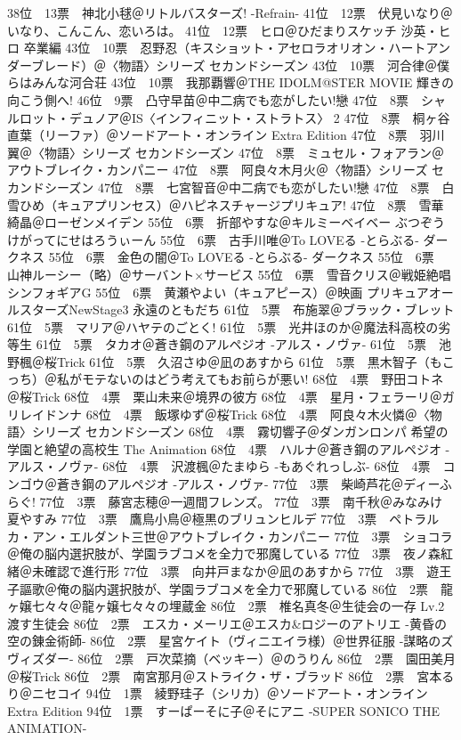 	38位　13票　神北小毬＠リトルバスターズ! -Refrain-
	41位　12票　伏見いなり＠いなり、こんこん、恋いろは。
	41位　12票　ヒロ＠ひだまりスケッチ 沙英・ヒロ 卒業編
	43位　10票　忍野忍（キスショット・アセロラオリオン・ハートアンダーブレード）＠〈物語〉シリーズ セカンドシーズン
	43位　10票　河合律＠僕らはみんな河合荘
	43位　10票　我那覇響＠THE IDOLM@STER MOVIE 輝きの向こう側へ!
	46位　9票　凸守早苗＠中二病でも恋がしたい!戀
	47位　8票　シャルロット・デュノア＠IS〈インフィニット・ストラトス〉 2
	47位　8票　桐ヶ谷直葉（リーファ）＠ソードアート・オンライン Extra Edition
	47位　8票　羽川翼＠〈物語〉シリーズ セカンドシーズン
	47位　8票　ミュセル・フォアラン＠アウトブレイク・カンパニー
	47位　8票　阿良々木月火＠〈物語〉シリーズ セカンドシーズン
	47位　8票　七宮智音＠中二病でも恋がしたい!戀
	47位　8票　白雪ひめ（キュアプリンセス）＠ハピネスチャージプリキュア!
	47位　8票　雪華綺晶＠ローゼンメイデン
	55位　6票　折部やすな＠キルミーベイベー ぶつぞうけがってにせはろうぃーん
	55位　6票　古手川唯＠To LOVEる -とらぶる- ダークネス
	55位　6票　金色の闇＠To LOVEる -とらぶる- ダークネス
	55位　6票　山神ルーシー（略）＠サーバント×サービス
	55位　6票　雪音クリス＠戦姫絶唱シンフォギアG
	55位　6票　黄瀬やよい（キュアピース）＠映画 プリキュアオールスターズNewStage3 永遠のともだち
	61位　5票　布施翠＠ブラック・ブレット
	61位　5票　マリア＠ハヤテのごとく!
	61位　5票　光井ほのか＠魔法科高校の劣等生
	61位　5票　タカオ＠蒼き鋼のアルペジオ -アルス・ノヴァ-
	61位　5票　池野楓＠桜Trick
	61位　5票　久沼さゆ＠凪のあすから
	61位　5票　黒木智子（もこっち）＠私がモテないのはどう考えてもお前らが悪い!
	68位　4票　野田コトネ＠桜Trick
	68位　4票　栗山未来＠境界の彼方
	68位　4票　星月・フェラーリ＠ガリレイドンナ
	68位　4票　飯塚ゆず＠桜Trick
	68位　4票　阿良々木火憐＠〈物語〉シリーズ セカンドシーズン
	68位　4票　霧切響子＠ダンガンロンパ 希望の学園と絶望の高校生 The Animation
	68位　4票　ハルナ＠蒼き鋼のアルペジオ -アルス・ノヴァ-
	68位　4票　沢渡楓＠たまゆら -もあぐれっしぶ-
	68位　4票　コンゴウ＠蒼き鋼のアルペジオ -アルス・ノヴァ-
	77位　3票　柴崎芦花＠ディーふらぐ!
	77位　3票　藤宮志穂＠一週間フレンズ。
	77位　3票　南千秋＠みなみけ 夏やすみ
	77位　3票　鷹鳥小鳥＠極黒のブリュンヒルデ
	77位　3票　ペトラルカ・アン・エルダント三世＠アウトブレイク・カンパニー
	77位　3票　ショコラ＠俺の脳内選択肢が、学園ラブコメを全力で邪魔している
	77位　3票　夜ノ森紅緒＠未確認で進行形
	77位　3票　向井戸まなか＠凪のあすから
	77位　3票　遊王子謳歌＠俺の脳内選択肢が、学園ラブコメを全力で邪魔している
	86位　2票　龍ヶ嬢七々々＠龍ヶ嬢七々々の埋蔵金
	86位　2票　椎名真冬＠生徒会の一存 Lv.2 渡す生徒会
	86位　2票　エスカ・メーリエ＠エスカ\&ロジーのアトリエ -黄昏の空の錬金術師-
	86位　2票　星宮ケイト（ヴィニエイラ様）＠世界征服 -謀略のズヴィズダー-
	86位　2票　戸次菜摘（ベッキー）＠のうりん
	86位　2票　園田美月＠桜Trick
	86位　2票　南宮那月＠ストライク・ザ・ブラッド
	86位　2票　宮本るり＠ニセコイ
	94位　1票　綾野珪子（シリカ）＠ソードアート・オンライン Extra Edition
	94位　1票　すーぱーそに子＠そにアニ -SUPER SONICO THE ANIMATION-

